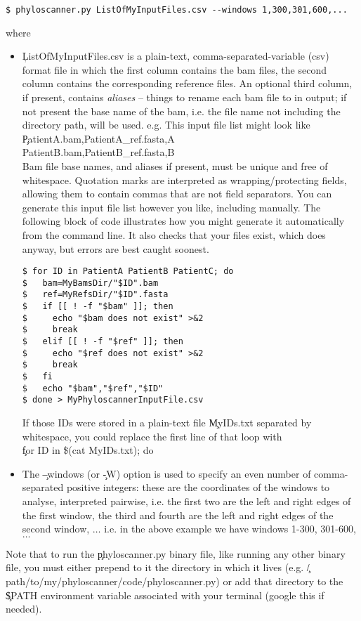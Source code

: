 \begin{verbatim}
$ phyloscanner.py ListOfMyInputFiles.csv --windows 1,300,301,600,...
\end{verbatim}
where
\begin{itemize}
\item \c{ListOfMyInputFiles.csv} is a plain-text, comma-separated-variable (csv) format file in which the first column contains the bam files, the second column contains the corresponding reference files.
An optional third column, if present, contains {\it aliases} -- things to rename each bam file to in \p output; if not present the base name of the bam, i.e. the file name not including the directory path, will be used.
e.g. This input file list might look like\\
\c{PatientA.bam,PatientA\_ref.fasta,A\\
PatientB.bam,PatientB\_ref.fasta,B}\\
Bam file base names, and aliases if present, must be unique and free of whitespace.
Quotation marks are interpreted as wrapping/protecting fields, allowing them to contain commas that are not field separators.
You can generate this input file list however you like, including manually.
The following block of code illustrates how you might generate it automatically from the command line.
It also checks that your files exist, which \p does anyway, but errors are best caught soonest.
\begin{verbatim}
$ for ID in PatientA PatientB PatientC; do
$   bam=MyBamsDir/"$ID".bam
$   ref=MyRefsDir/"$ID".fasta
$   if [[ ! -f "$bam" ]]; then
$     echo "$bam does not exist" >&2
$     break
$   elif [[ ! -f "$ref" ]]; then
$     echo "$ref does not exist" >&2
$     break
$   fi
$   echo "$bam","$ref","$ID"
$ done > MyPhyloscannerInputFile.csv
\end{verbatim}
If those IDs were stored in a plain-text file \c{MyIDs.txt} separated by whitespace, you could replace the first line of that loop with\\
\c{for ID in \$(cat MyIDs.txt); do}
\item The \c{--windows} (or \c{-W}) option is used to specify an even number of comma-separated positive integers: these are the coordinates of the windows to analyse, interpreted pairwise, i.e. the first two are the left and right edges of the first window, the third and fourth are the left and right edges of the second window, $\ldots$ i.e. in the above example we have windows 1-300, 301-600, $\ldots$
\end{itemize}
Note that to run the \c{phyloscanner.py} binary file, like running any other binary file, you must either prepend to it the directory in which it lives (e.g. \c{/path/to/my/phyloscanner/code/phyloscanner.py}) or add that directory to the \c{\$PATH} environment variable associated with your terminal (google this if needed).

